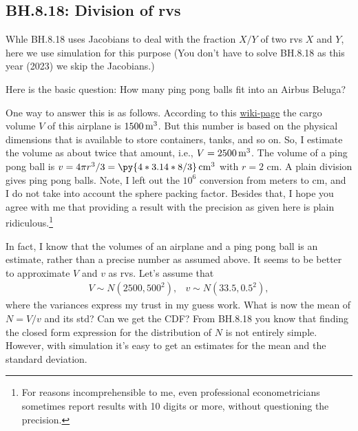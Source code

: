 \subsection{BH.8.18: Division of rvs}





Whle BH.8.18 uses Jacobians to deal with the fraction $X/Y$ of two rvs $X$ and $Y$, here we use simulation for this purpose
(You don't have to solve BH.8.18 as this year (2023) we skip the Jacobians.)

Here is the basic question: How many ping pong balls fit into an Airbus Beluga?


One way to answer this is as follows.
According to this \href{https://en.wikipedia.org/wiki/Airbus\_Beluga}{wiki-page} the cargo volume $V$ of this airplane is $1500 \,\mathrm{m}^{3}$.
But this number is based on the physical dimensions that is available to store containers, tanks, and so on.
So, I estimate the volume as about twice that amount, i.e., $V = 2500 \,\mathrm{m}^{3}$.
The volume of a ping pong ball is $v = 4 \pi r^3/3  = \py{4*3.14*8/3} \cm^{3}$ with $r=2$ cm.
A plain division gives  ping pong balls.
Note, I left out the $10^{6}$ conversion from meters to cm, and I do not take into  account the sphere packing factor.
Besides that, I hope you agree with me that providing a result with the precision as given here is plain ridiculous.\footnote{For reasons incomprehensible to me, even professional econometricians sometimes  report results with 10 digits or more, without questioning the precision.}


In fact, I know that the volumes of an airplane and a ping pong ball is an estimate, rather than a precise number as assumed above.
It seems to be better to approximate $V$ and $v$ as rvs.
Let's assume that
   \begin{align*}
V \sim N(2500, 500^{2}), & v \sim N(33.5, 0.5^{2}),
\end{align*}
where the variances express my trust in my guess work.
What is now the mean of $N = V/v$ and its std? Can we get the CDF?
From BH.8.18 you know that finding the closed form expression for the distribution of $N$ is not entirely simple.
However, with simulation it's easy to get an estimates for the mean and the standard deviation.



